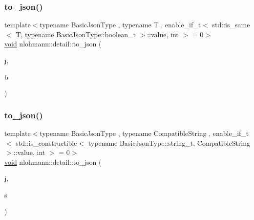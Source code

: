 \subsubsection{\texorpdfstring{to\_json()}{to\_json()}\hspace{0.1cm}{\footnotesize\ttfamily [1/17]}}
{\footnotesize\ttfamily template$<$typename Basic\+Json\+Type , typename T , enable\+\_\+if\+\_\+t$<$ std\+::is\+\_\+same$<$ T, typename Basic\+Json\+Type\+::boolean\+\_\+t $>$\+::value, int $>$  = 0$>$ \\
\mbox{\hyperlink{namespacenlohmann_1_1detail_a59fca69799f6b9e366710cb9043aa77d}{void}} nlohmann\+::detail\+::to\+\_\+json (\begin{DoxyParamCaption}\item[{Basic\+Json\+Type \&}]{j,  }\item[{\mbox{\hyperlink{_keyboard_event_8h_adf1f3edb9115acb0a1e04209b7a9937b}{T}}}]{b }\end{DoxyParamCaption})\hspace{0.3cm}{\ttfamily [noexcept]}}

\mbox{\label{namespacenlohmann_1_1detail_a7356ed05cdbbb080cee80e1211e1c6c9}} 
\subsubsection{\texorpdfstring{to\_json()}{to\_json()}\hspace{0.1cm}{\footnotesize\ttfamily [2/17]}}
{\footnotesize\ttfamily template$<$typename Basic\+Json\+Type , typename Compatible\+String , enable\+\_\+if\+\_\+t$<$ std\+::is\+\_\+constructible$<$ typename Basic\+Json\+Type\+::string\+\_\+t, Compatible\+String $>$\+::value, int $>$  = 0$>$ \\
\mbox{\hyperlink{namespacenlohmann_1_1detail_a59fca69799f6b9e366710cb9043aa77d}{void}} nlohmann\+::detail\+::to\+\_\+json (\begin{DoxyParamCaption}\item[{Basic\+Json\+Type \&}]{j,  }\item[{const Compatible\+String \&}]{s }\end{DoxyParamCaption})}

\mbox{\label{namespacenlohmann_1_1detail_a4aa1ca6b7c61bf19d1f30ea5b669f68e}} 
